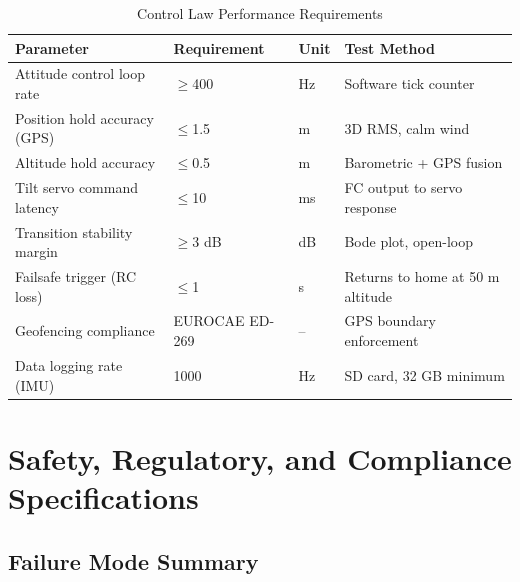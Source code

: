 \begin{table}[H]
\centering
\small
\caption{Control Law Performance Requirements}
\begin{tabularx}{\textwidth}{L{5cm} C{3cm} C{1.5cm} X}
\toprule
\textbf{Parameter} &
\textbf{Requirement} &
\textbf{Unit} &
\textbf{Test Method} \\
\midrule
Attitude control loop rate     & $\geq$400        & Hz   & Software tick counter \\
Position hold accuracy (GPS)   & $\leq$1.5        & m    & 3D RMS, calm wind \\
Altitude hold accuracy         & $\leq$0.5        & m    & Barometric + GPS fusion \\
Tilt servo command latency     & $\leq$10         & ms   & FC output to servo response \\
Transition stability margin    & $\geq$3 dB       & dB   & Bode plot, open-loop \\
Failsafe trigger (RC loss)     & $\leq$1          & s    & Returns to home at 50 m altitude \\
Geofencing compliance          & EUROCAE ED-269   & --   & GPS boundary enforcement \\
Data logging rate (IMU)        & 1000             & Hz   & SD card, 32 GB minimum \\
\bottomrule
\end{tabularx}
\end{table}

\section{Safety, Regulatory, and Compliance Specifications}

\subsection{Failure Mode Summary}

